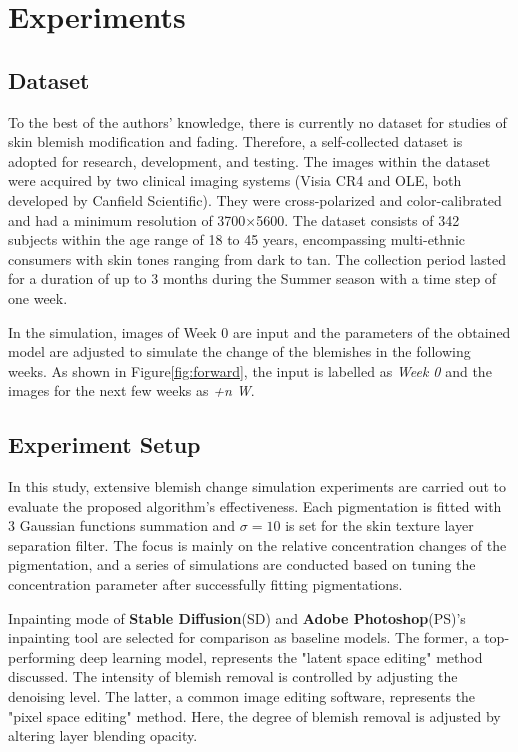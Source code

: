 
\chapter{Experiments}
\begin{spacing}{1.5}
\setlength{\parskip}{0.3in}
\section{Dataset}
To the best of the authors' knowledge, there is currently no dataset for studies of skin blemish modification and fading. Therefore, a self-collected dataset is adopted for research, development, and testing. The images within the dataset were acquired by two clinical imaging systems (Visia CR4 and OLE, both developed by Canfield Scientific). They were cross-polarized and color-calibrated and had a minimum resolution of 3700$\times$5600. The dataset consists of 342 subjects within the age range of 18 to 45 years, encompassing multi-ethnic consumers with skin tones ranging from dark to tan. The collection period lasted for a duration of up to 3 months during the Summer season with a time step of one week.

In the simulation, images of Week 0 are input and the parameters of the obtained model are adjusted to simulate the change of the blemishes in the following weeks. As shown in Figure\ref{fig:forward}, the input is labelled as \textit{Week 0} and the images for the next few weeks as \textit{+n W}.

\section{Experiment Setup}
In this study, extensive blemish change simulation experiments are carried out to evaluate the proposed algorithm's effectiveness. Each pigmentation is fitted with 3 Gaussian functions summation and $\sigma=10$ is set for the skin texture layer separation filter. The focus is mainly on the relative concentration changes of the pigmentation, and a series of simulations are conducted based on tuning the concentration parameter after successfully fitting pigmentations.

Inpainting mode of \textbf{Stable Diffusion}(SD)\cite{rombach2021highresolution} and \textbf{Adobe Photoshop}(PS)'s inpainting tool\cite{adobephotoshop} are selected for comparison as baseline models. The former, a top-performing deep learning model, represents the "latent space editing" method discussed. The intensity of blemish removal is controlled by adjusting the denoising level. The latter, a common image editing software, represents the "pixel space editing" method. Here, the degree of blemish removal is adjusted by altering layer blending opacity.


\end{spacing}
